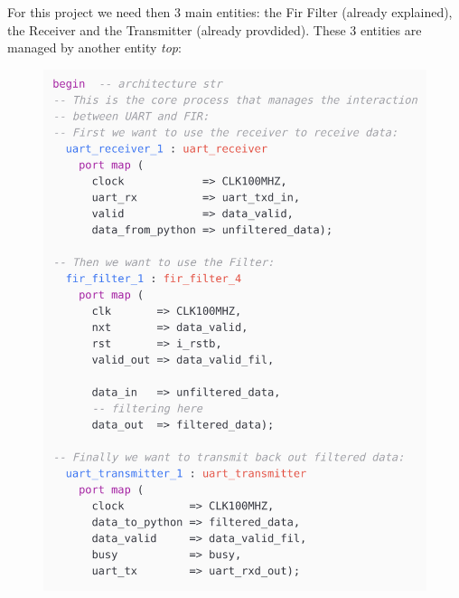 \documentclass[11pt,a4paper,twocolumn]{IEEEtran}
\begin{document}
	For this project we need then 3 main entities: the Fir Filter (already explained), the Receiver and the Transmitter (already provdided). These 3 entities are managed by another entity \emph{top}:
	\begin{figure}[h]
		\centering
		\hspace*{-.8cm}\includegraphics[width=1.1\linewidth]{img/code1}
	\end{figure}\newpage
\end{document}
